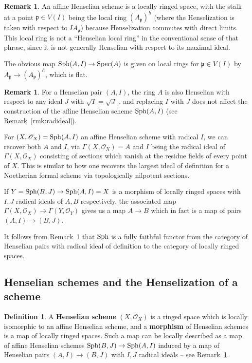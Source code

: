 \documentclass[12pt]{article}
\renewcommand{\O}{\mathscr{O}}
\newcommand{\spec}{{\rm Spec}}
\newcommand{\sph}{{\rm Sph}}
\newcommand{\mf}[1]{\mathfrak{#1}}
\newcommand{\spcite}[2]{\cite[\href{https://stacks.math.columbia.edu/tag/#1}{{#2} {#1}}]{stackp}}
\theoremstyle{definition}
\newtheorem{definition}[theorem]{Definition}
\newtheorem{remark}[theorem]{Remark}
\numberwithin{equation}{subsection}
\begin{document}
\begin{remark}\label{rmk:locringspace} An affine Henselian scheme is a locally ringed space, with the stalk at a point $\mf{p} \in V(I)$ being the local ring $(A_{\mf{p}})^h$ (where the Henselization is taken with respect to $IA_{\mf{p}}$) because Henselization commutes with direct limits. This local ring is not a ``Henselian local ring'' in the conventional sense of that phrase, since it is not generally Henselian with respect to its maximal ideal.

The obvious map $\sph(A,I) \to \spec(A)$ is given on local rings for $\mf{p} \in V(I)$ by $A_{\mf{p}} \to (A_{\mf{p}})^h$, which is flat. \end{remark}

\begin{remark}\label{rmk:maphens} For a Henselian pair $(A,I)$, the ring $A$ is also Henselian with respect to any ideal $J$ with $\sqrt{I}=\sqrt{J}$ \spcite{09XJ}{Lemma}, and replacing $I$ with $J$ does not affect the construction of the affine Henselian scheme $\sph(A,I)$ (see Remark~\ref{rmk:radideal}).

For $(X,\O_X)=\sph(A,I)$ an affine Henselian scheme with radical $I$, we can recover both $A$ and $I$, via $\Gamma(X,\O_X)=A$ and $I$ being the radical ideal of $\Gamma(X,\O_X)$ consisting of sections which vanish at the residue fields of every point of $X$. This is similar to how one recovers the largest ideal of definition for a Noetherian formal scheme via topologically nilpotent sections.


If $Y=\sph(B,J) \to \sph(A,I)=X$ is a morphism of locally ringed spaces with $I,J$ radical ideals of $A,B$ respectively, the associated map $\Gamma(X,\O_X) \to \Gamma(Y,\O_Y)$ gives us a map $A \to B$ which in fact is a map of pairs $(A,I) \to (B,J)$. \end{remark} 


It follows from Remark~\ref{rmk:maphens} that $\sph$ is a fully faithful functor from the category of Henselian pairs with radical ideal of definition to the category of locally ringed spaces.


\subsection{Henselian schemes and the Henselization of a scheme}

\begin{definition}\label{def:henssch}
 A {\bf Henselian scheme} $(X,\O_X)$ is a ringed space which is locally isomorphic to an affine Henselian scheme, and a {\bf morphism} of Henselian schemes is a map of locally ringed spaces. Such a map can be locally described as a map of affine Henselian schemes $\sph(B,J) \to \sph(A,I)$ induced by a map of Henselian pairs $(A,I) \to (B,J)$ with $I,J$ radical ideals -- see Remark~\ref{rmk:maphens}.
\end{definition}
\end{document}
